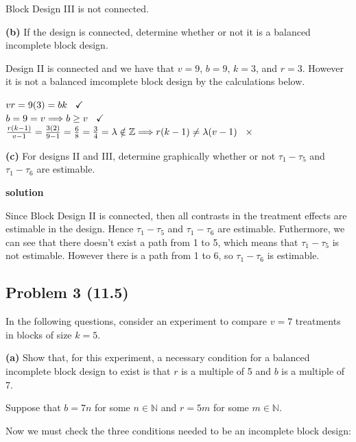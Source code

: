 \documentclass[12pt,]{article}
\begin{document}
Block Design III is not connected.

\textbf{(b)} If the design is connected, determine whether or not it is
a balanced incomplete block design.

Design II is connected and we have that \(v=9\), \(b=9\), \(k=3\), and
\(r=3\). However it is not a balanced imcomplete block design by the
calculations below.

\begin{center}
$vr = 9(3) = bk \hspace{.3cm}  \checkmark$\\
$b= 9 = v \Longrightarrow b \geq v \hspace{.3cm}  \checkmark$\\
$\frac{r(k-1)}{v-1} = \frac{3(2)}{9-1} = \frac{6}{8} = \frac{3}{4} = \lambda  \notin \mathbb{Z} \Longrightarrow r(k-1) \neq \lambda (v-1)  \hspace{.3cm} \times$
\end{center}

\textbf{(c)} For designs II and III, determine graphically whether or
not \(\tau_1 - \tau_5\) and \(\tau_1 - \tau_6\) are estimable.

\textbf{solution}

Since Block Design II is connected, then all contrasts in the treatment
effects are estimable in the design. Hence \(\tau_1 - \tau_5\) and
\(\tau_1 - \tau_6\) are estimable. Futhermore, we can see that there
doesn't exist a path from 1 to 5, which means that \(\tau_1 - \tau_5\)
is not estimable. However there is a path from 1 to 6, so
\(\tau_1 - \tau_6\) is estimable.

\subsection{Problem 3 (11.5)}\label{problem-3-11.5}

In the following questions, consider an experiment to compare \(v = 7\)
treatments in blocks of size \(k = 5\).

\textbf{(a)} Show that, for this experiment, a necessary condition for a
balanced incomplete block design to exist is that \(r\) is a multiple of
5 and \(b\) is a multiple of 7.

Suppose that \(b= 7n\) for some \(n \in \mathbb{N}\) and \(r= 5m\) for
some \(m \in \mathbb{N}\).

Now we must check the three conditions needed to be an incomplete block
design:
\end{document}
